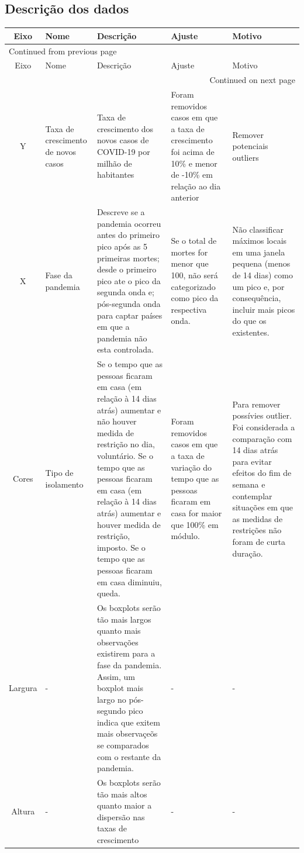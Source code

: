 \documentclass{SelfArx}
\begin{document}
\subsection*{Descrição dos dados}
\label{sec:org33d16d3}
\begin{longtable}{c|p{2cm}|p{5cm}|p{5cm}|p{3cm}}
\hline
Eixo & Nome & Descrição & Ajuste & Motivo\\
\hline
\endfirsthead
\multicolumn{5}{l}{Continued from previous page} \\
\hline

Eixo & Nome & Descrição & Ajuste & Motivo \\

\hline
\endhead
\hline\multicolumn{5}{r}{Continued on next page} \\
\endfoot
\endlastfoot
\hline
Y & Taxa de crescimento de novos casos & Taxa de crescimento dos novos casos de COVID-19 por milhão de habitantes & Foram removidos casos em que a taxa de crescimento foi acima de 10\% e menor de -10\% em relação ao dia anterior & Remover potenciais outliers\\
\hline
X & Fase da pandemia & Descreve se a pandemia ocorreu antes do primeiro pico após as 5 primeiras mortes; desde o primeiro pico ate o pico da segunda onda e; pós-segunda onda para captar países em que a pandemia não esta controlada. & Se o total de mortes for menor que 100, não será categorizado como pico da respectiva onda. & Não classificar máximos locais em uma janela pequena (menos de 14 dias) como um pico e, por consequência, incluir mais picos do que os existentes.\\
\hline
Cores & Tipo de isolamento & Se o tempo que as pessoas ficaram em casa (em relação à 14 dias atrás) aumentar e não houver medida de restrição no dia, voluntário. Se o tempo que as pessoas ficaram em casa (em relação à 14 dias atrás) aumentar e houver medida de restrição, imposto. Se o tempo que as pessoas ficaram em casa diminuiu, queda. & Foram removidos casos em que a taxa de variação do tempo que as pessoas ficaram em casa for maior que 100\% em módulo. & Para remover possívies outlier. Foi considerada a comparação com 14 dias atrás para evitar efeitos do fim de semana e contemplar situações em que as medidas de restrições não foram de curta duração.\\
\hline
Largura & - & Os boxplots serão tão mais largos quanto mais observações existirem para a fase da pandemia. Assim, um boxplot mais largo no pós-segundo pico indica que exitem mais observaçeõs se comparados com o restante da pandemia. & - & -\\
\hline
Altura & - & Os boxplots serão tão mais altos quanto maior a dispersão nas taxas de crescimento & - & -\\
\hline
\end{longtable}
\end{document}
